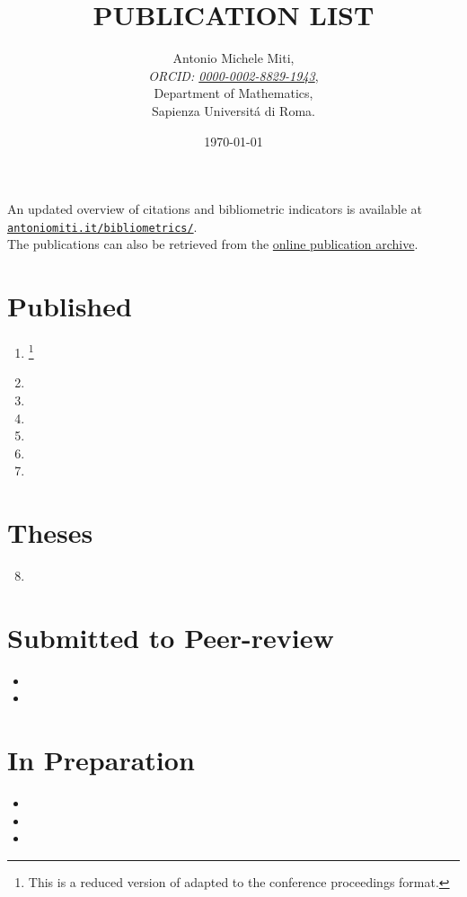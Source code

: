 \documentclass[a4paper]{article}
\title{PUBLICATION LIST}
\date{\today}
\author{
  Antonio Michele Miti,\\
  \emph{ORCID: \href{https://orcid.org/0000-0002-8829-1943}{0000-0002-8829-1943}},\\
  Department of Mathematics,\\
  Sapienza Universit\'a di Roma.
}
\begin{document}
\maketitle

\noindent
An updated overview of citations and bibliometric indicators is available at
\href{https://antoniomiti.it/bibliometrics/}{\texttt{antoniomiti.it/bibliometrics/}}.
\\
The publications can also be retrieved from the
\href{https://www.dropbox.com/sh/asop74adf1c0gbi/AADDEeq-8XCf3IISOMzrlbroa?dl=0}{online publication archive}.

\section*{Published}
\begin{enumerate}
  \item {}\footnote{This is a reduced version of \cite{Luongo2024} adapted to the conference proceedings format.}
  \item {}
  \item {}
  \item {}
  \item {}
  \item {}
  \item {}
\end{enumerate}

\section*{Theses}
\begin{enumerate}
  \setcounter{enumi}{7}
  \item {}
\end{enumerate}

\section*{Submitted to Peer-review}
\begin{itemize}
  \item {}
  \item {}
\end{itemize}

\section*{In Preparation}
\begin{itemize}
  \item {}
  \item {}
  \item {}
\end{itemize}
\end{document}

